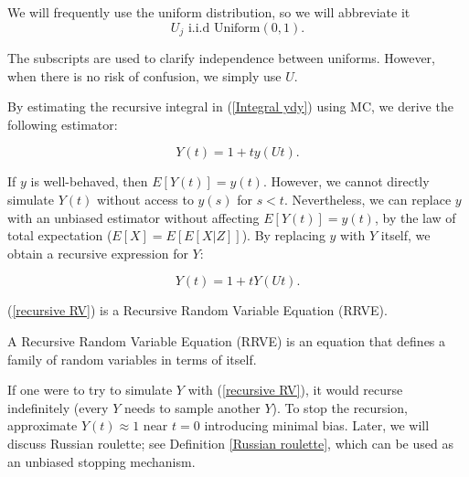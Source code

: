 \documentclass[a4paper,12pt]{article}
\begin{document}
\begin{notation}[$U,U_{j}$]
    We will frequently use the uniform distribution, so we will abbreviate it
    \begin{equation}
        U_{j}  \text{ i.i.d Uniform}(0,1).
    \end{equation}

    The subscripts are used to clarify independence
    between uniforms. However,
    when there is no risk of confusion,
    we simply use $U$.

\end{notation}

By estimating the recursive integral in (\ref{Integral ydy})
using MC, we derive the following estimator:

\begin{equation}
    Y(t) = 1 + t  y(Ut).
\end{equation}


If $y$ is well-behaved, then $E[Y(t)] = y(t)$.
However, we cannot directly simulate $Y(t)$ without access
to $y(s)$ for $s < t$. Nevertheless, we can replace $y$ with
an unbiased estimator without affecting $E[Y(t)] = y(t)$,
by the law of total expectation ($E[X] = E[E[X|Z]]$).
By replacing $y$ with $Y$ itself, we obtain a recursive
expression for $Y$:

\begin{equation} \label{recursive RV}
    Y(t) = 1 + t  Y(Ut).
\end{equation}


(\ref{recursive RV}) is a Recursive Random Variable
Equation (RRVE).

\begin{definition}
    A Recursive Random Variable Equation (RRVE) is
    an equation that defines a
    family of random variables in terms of itself.
\end{definition}

If one were to try to simulate $Y$ with (\ref{recursive RV}),
it would recurse indefinitely (every $Y$ needs to sample another $Y$).
To stop the recursion, approximate
$Y(t) \approx 1$ near $t = 0$ introducing minimal bias.
Later, we will discuss Russian roulette; see Definition \ref{Russian roulette},
which can be used as an unbiased stopping mechanism.


\end{document}

